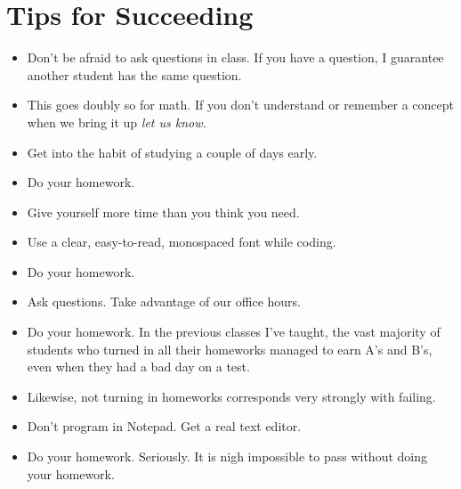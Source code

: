 \documentclass[10pt, letter]{article}
\begin{document}
\section*{Tips for Succeeding}
\begin{itemize}
	\item Don't be afraid to ask questions in class.  If you have a question, I guarantee another student has the same question.  
	\item This goes doubly so for math.  If you don't understand or remember a concept when we bring it up \emph{let us know.}
	\item Get into the habit of studying a couple of days early.
	\item Do your homework.
	\item Give yourself more time than you think you need.
	\item Use a clear, easy-to-read, monospaced font while coding.
	\item Do your homework.
	\item Ask questions.  Take advantage of our office hours.
	\item Do your homework.  In the previous classes I've taught, the vast majority of students who turned in all their homeworks managed to earn A's and B's, even when they had a bad day on a test.
	\item Likewise, not turning in homeworks corresponds very strongly with failing.
	\item Don't program in Notepad.  Get a real text editor.
	\item Do your homework. Seriously.  It is nigh impossible to pass without doing your homework.
	
	
\end{itemize}
\end{document}
